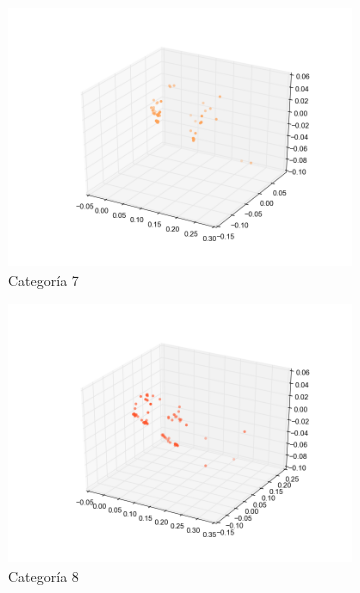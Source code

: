 \begin{figure}[H]
\begin{subfigure}[b]{0.33\textwidth}
                \includegraphics[width=\linewidth]{secciones/graficos/oja/categoria_7.png}
                \caption{Categoría 7}
                \label{fig: ej1_oja_categoria_7}
        \end{subfigure}
        \begin{subfigure}[b]{0.33\textwidth}
                \includegraphics[width=\linewidth]{secciones/graficos/oja/categoria_8.png}
                \caption{Categoría 8}
                \label{fig: ej1_oja_categoria_8}
        \end{subfigure}
        \begin{subfigure}[b]{0.33\textwidth}

\end{subfigure}
\end{figure}
